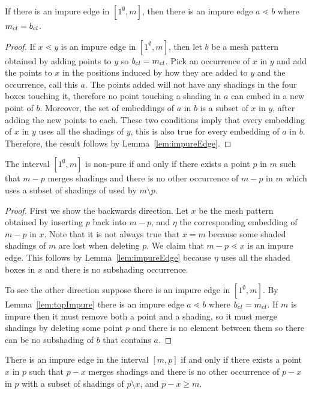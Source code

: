 \documentclass[11pt,a4paper,oneside]{article}
\begin{document}
\begin{lem}\label{lem:topImpure}
If there is an impure edge in $[1^\emptyset,m]$, then there is an impure edge
$a\lessdot b$ where $m_{cl}=b_{cl}$.
\begin{proof}
If $x\lessdot y$ is an impure edge in $[1^\emptyset,m]$, then let $b$ be a mesh
pattern obtained by adding points to $y$ so $b_{cl} = m_{cl}$. Pick
an occurrence of $x$ in $y$ and add the points to $x$ in the positions induced by
how they are added to $y$ and the occurrence, call this $a$. The points added
will not have any shadings in the four boxes touching it, therefore no point
touching a shading in $a$ can embed in a new point of $b$. Moreover, the set of
embeddings of $a$ in $b$ is a subset of $x$ in $y$, after adding the new points
to each. These two conditions imply that every embedding of $x$ in $y$ uses
all the shadings of $y$, this is also true for every embedding of $a$ in $b$.
Therefore, the result follows by Lemma~\ref{lem:impureEdge}.
\end{proof}
\end{lem}

\begin{prop}
The interval $[1^\emptyset,m]$ is non-pure if and
only if there exists a point $p$ in $m$ such that $m-p$ merges shadings and
there is no other occurrence of $m-p$ in $m$ which uses a subset of shadings of
used by $m\setminus p$.
\begin{proof}
First we show the backwards direction. Let $x$  be the mesh pattern obtained by
inserting $p$ back into $m-p$, and $\eta$ the corresponding embedding of $m-p$
in $x$. Note that it is not always true that $x=m$ because some shaded shadings
of $m$ are lost when deleting $p$. We claim that $m-p\lessdot x$ is an impure
edge. This follows by Lemma~\ref{lem:impureEdge} because $\eta$ uses all the
shaded boxes in $x$ and there is no subshading occurrence.

To see the other direction suppose there is an impure edge in $[1^{\emptyset},m]$. By
Lemma~\ref{lem:topImpure} there is an impure edge $a\lessdot b$ where
$b_{cl}=m_{cl}$. If $m$ is impure then it must remove both a point and a shading,
so it must merge shadings by deleting some point $p$ and there is no element
between them so there can be no subshading of $b$ that contains $a$.
\end{proof}
\end{prop}

\begin{cor}
There is an impure edge in the interval $[m,p]$ if and only if there exists a
point $x$ in $p$ such that $p-x$ merges shadings and there is no other
occurrence of $p-x$ in $p$ with a subset of shadings of $p\setminus x$, and
$p-x\ge m$.
\end{cor}
\end{document}
